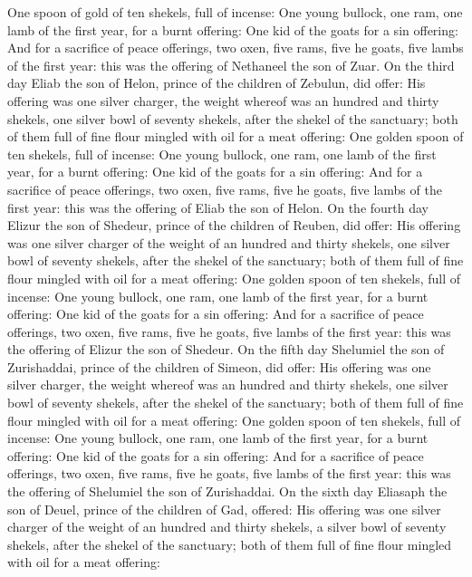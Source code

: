 \begin{biblechapter}
\verse One spoon of gold of ten shekels, full of incense:
\verse One young bullock, one ram, one lamb of the first year, for a burnt offering:
\verse One kid of the goats for a sin offering:
\verse And for a sacrifice of peace offerings, two oxen, five rams, five he goats, five lambs of the first year: this was the offering of Nethaneel the son of Zuar.
\verse On the third day Eliab the son of Helon, prince of the children of Zebulun, did offer:
\verse His offering was one silver charger, the weight whereof was an hundred and thirty shekels, one silver bowl of seventy shekels, after the shekel of the sanctuary; both of them full of fine flour mingled with oil for a meat offering:
\verse One golden spoon of ten shekels, full of incense:
\verse One young bullock, one ram, one lamb of the first year, for a burnt offering:
\verse One kid of the goats for a sin offering:
\verse And for a sacrifice of peace offerings, two oxen, five rams, five he goats, five lambs of the first year: this was the offering of Eliab the son of Helon.
\verse On the fourth day Elizur the son of Shedeur, prince of the children of Reuben, did offer:
\verse His offering was one silver charger of the weight of an hundred and thirty shekels, one silver bowl of seventy shekels, after the shekel of the sanctuary; both of them full of fine flour mingled with oil for a meat offering:
\verse One golden spoon of ten shekels, full of incense:
\verse One young bullock, one ram, one lamb of the first year, for a burnt offering:
\verse One kid of the goats for a sin offering:
\verse And for a sacrifice of peace offerings, two oxen, five rams, five he goats, five lambs of the first year: this was the offering of Elizur the son of Shedeur.
\verse On the fifth day Shelumiel the son of Zurishaddai, prince of the children of Simeon, did offer:
\verse His offering was one silver charger, the weight whereof was an hundred and thirty shekels, one silver bowl of seventy shekels, after the shekel of the sanctuary; both of them full of fine flour mingled with oil for a meat offering:
\verse One golden spoon of ten shekels, full of incense:
\verse One young bullock, one ram, one lamb of the first year, for a burnt offering:
\verse One kid of the goats for a sin offering:
\verse And for a sacrifice of peace offerings, two oxen, five rams, five he goats, five lambs of the first year: this was the offering of Shelumiel the son of Zurishaddai.
\verse On the sixth day Eliasaph the son of Deuel, prince of the children of Gad, offered:
\verse His offering was one silver charger of the weight of an hundred and thirty shekels, a silver bowl of seventy shekels, after the shekel of the sanctuary; both of them full of fine flour mingled with oil for a meat offering:

\end{biblechapter}
